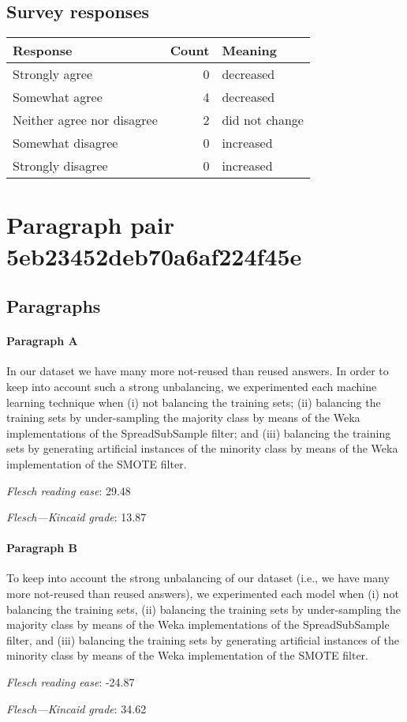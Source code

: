 \subsection{Survey responses}
\begin{tabular}{lrl}
\toprule
          \textbf{Response} &  \textbf{Count} & \textbf{Meaning} \\
\midrule
             Strongly agree &               0 &        decreased \\
             Somewhat agree &               4 &        decreased \\
 Neither agree nor disagree &               2 &   did not change \\
          Somewhat disagree &               0 &        increased \\
          Strongly disagree &               0 &        increased \\
\bottomrule
\end{tabular}

\section{Paragraph pair 5eb23452deb70a6af224f45e}
\subsection{Paragraphs}
\paragraph{Paragraph A}
In our dataset we have many more not-reused than reused answers. In order to keep into account such a strong unbalancing, we experimented each machine learning technique when (i) not balancing the training sets; (ii) balancing the training sets by under-sampling the majority class by means of the Weka implementations of the SpreadSubSample filter; and (iii) balancing the training sets by generating artificial instances of the minority class by means of the Weka implementation of the SMOTE filter.\par\medskip
\emph{Flesch reading ease}: 29.48\par
\emph{Flesch---Kincaid grade}: 13.87

\paragraph{Paragraph B}
To keep into account the strong unbalancing of our dataset (i.e., we have many more not-reused than reused answers), we experimented each model when (i) not balancing the training sets, (ii) balancing the training sets by under-sampling the majority class by means of the Weka implementations of the SpreadSubSample filter, and (iii) balancing the training sets by generating artificial instances of the minority class by means of the Weka implementation of the SMOTE filter.\par\medskip
\emph{Flesch reading ease}: -24.87\par
\emph{Flesch---Kincaid grade}: 34.62

